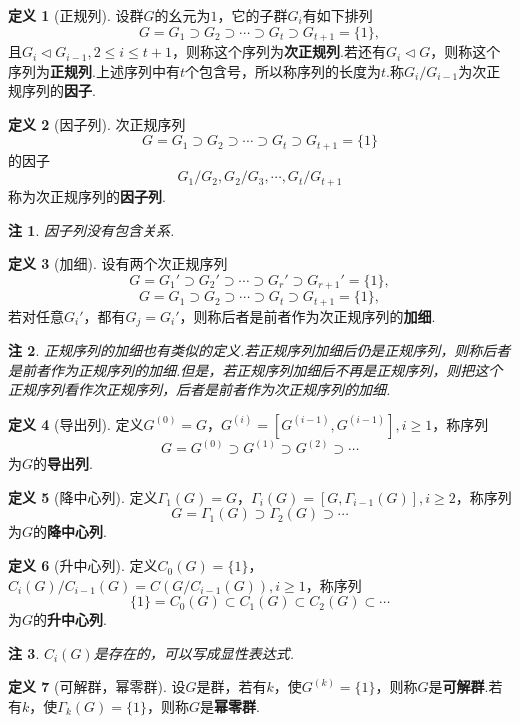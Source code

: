 \documentclass[12pt]{ctexart}
\theoremstyle{definition}
\newtheorem{definition}{定义}
\theoremstyle{plain}
\newtheorem*{remark}{注}
\begin{document}
	\begin{definition}[正规列]
		设群$G$的幺元为$1$，它的子群$G_i$有如下排列
		$$G=G_1\supset G_2\supset\cdots\supset G_t\supset G_{t+1}=\{1\},$$
		且$G_i\lhd G_{i-1},2\leqslant i\leqslant t+1$，则称这个序列为\textbf{次正规列}.若还有$G_i\lhd G$，则称这个序列为\textbf{正规列}.上述序列中有$t$个包含号，所以称序列的长度为$t$.称$G_i/G_{i-1}$为次正规序列的\textbf{因子}.
	\end{definition}
	\begin{definition}[因子列]
		次正规序列
		$$G=G_1\supset G_2\supset\cdots\supset G_t\supset G_{t+1}=\{1\}$$
		的因子
		$$G_1/G_2,G_2/G_3,\cdots,G_t/G_{t+1}$$
		称为次正规序列的\textbf{因子列}.
	\end{definition}
	\begin{remark}
		因子列没有包含关系.
	\end{remark}
	\begin{definition}[加细]
		设有两个次正规序列
		$$G=G_1'\supset G_2'\supset\cdots\supset G_r'\supset G_{r+1}'=\{1\},$$
		$$G=G_1\supset G_2\supset\cdots\supset G_t\supset G_{t+1}=\{1\},$$
		若对任意$G_i'$，都有$G_j=G_i'$，则称后者是前者作为次正规序列的\textbf{加细}.
	\end{definition}
	\begin{remark}
		正规序列的加细也有类似的定义.若正规序列加细后仍是正规序列，则称后者是前者作为正规序列的加细.但是，若正规序列加细后不再是正规序列，则把这个正规序列看作次正规序列，后者是前者作为次正规序列的加细.
	\end{remark}
	\begin{definition}[导出列]
		定义$G^{(0)}=G$，$G^{(i)}=\left[G^{(i-1)},G^{(i-1)}\right],i\geqslant1$，称序列
		$$G=G^{(0)}\supset G^{(1)}\supset G^{(2)}\supset\cdots$$
		为$G$的\textbf{导出列}.
	\end{definition}
	\begin{definition}[降中心列]
		定义$\varGamma_1(G)=G$，$\varGamma_i(G)=\left[G,\varGamma_{i-1}(G)\right],i\geqslant 2$，称序列
		$$G=\varGamma_1(G)\supset\varGamma_2(G)\supset\cdots$$
		为$G$的\textbf{降中心列}.
	\end{definition}
	\begin{definition}[升中心列]
		定义$C_0(G)=\{1\}$，$C_i(G)/C_{i-1}(G)=C(G/C_{i-1}(G)),i\geqslant 1$，称序列
		$$\{1\}=C_0(G)\subset C_1(G)\subset C_2(G)\subset\cdots$$
		为$G$的\textbf{升中心列}.
	\end{definition}
	\begin{remark}
		$C_i(G)$是存在的，可以写成显性表达式.
	\end{remark}
	\begin{definition}[可解群，幂零群]
		设$G$是群，若有$k$，使$G^{(k)}=\{1\}$，则称$G$是\textbf{可解群}.若有$k$，使$\varGamma_k(G)=\{1\}$，则称$G$是\textbf{幂零群}.
	\end{definition}
\end{document}
